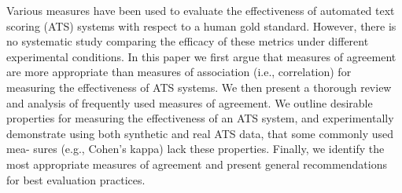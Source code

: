 Various measures have been used to evaluate the effectiveness of automated text scoring (ATS) systems with respect to a human gold standard. However, there is no systematic study comparing the efficacy of these metrics under different experimental conditions. In this paper we first argue that measures of agreement are more appropriate than measures of association (i.e., correlation) for measuring the effectiveness of ATS systems. We then present a thorough review and analysis of frequently used measures of agreement. We outline desirable properties for measuring the effectiveness of an ATS system, and experimentally demonstrate using both synthetic and real ATS data, that some commonly used mea- sures (e.g., Cohen's kappa) lack these properties. Finally, we identify the most appropriate measures of agreement and present general recommendations for best evaluation practices.
